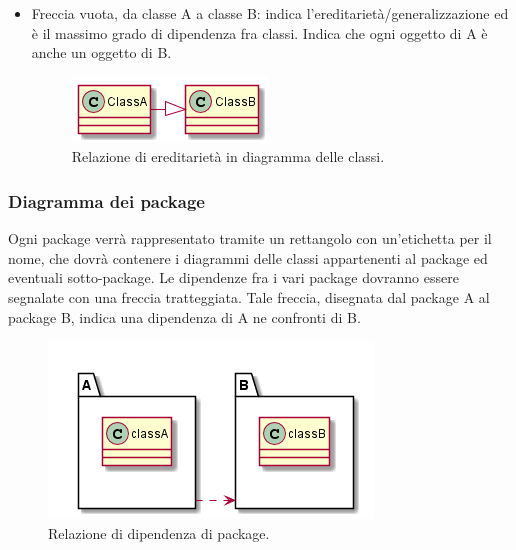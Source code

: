 \documentclass[NormeDiProgetto.tex]{subfiles}
\begin{document}
\begin{itemize}
	\item Freccia vuota, da classe A a classe B: indica l'ereditarietà/generalizzazione ed è il massimo grado di dipendenza fra classi. Indica che ogni oggetto di A è anche un oggetto di B.
	\begin{figure}[H]
		\centering
		\includegraphics[width=0.4\linewidth]{progettazione/ered}
		\caption{Relazione di ereditarietà in diagramma delle classi.}
		\label{fig:ered}
	\end{figure}
	
\end{itemize}
\newpage
\subsubsection{Diagramma dei package}
Ogni package verrà rappresentato tramite un rettangolo con un'etichetta per il nome, che dovrà contenere i diagrammi delle classi appartenenti al package ed eventuali sotto-package. Le dipendenze fra i vari package dovranno essere segnalate con una freccia tratteggiata. Tale freccia, disegnata dal package A al package B, indica una dipendenza di A ne confronti di B.
\begin{figure}[H]
	\centering
	\includegraphics[width=0.4\linewidth]{progettazione/package}
	\caption{Relazione di dipendenza di package.}
	\label{fig:package}
\end{figure}
\end{document}
